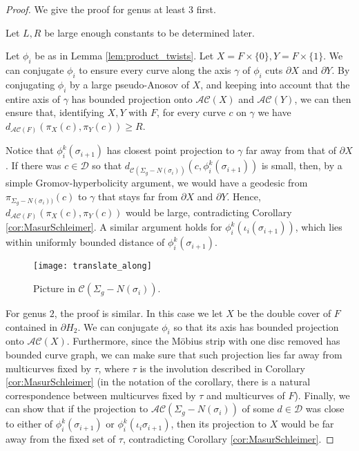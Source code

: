 \documentclass[11pt, oneside]{amsart}
\theoremstyle{definition}
\theoremstyle{definition}
\newcommand{\calD} {\ensuremath {\mathcal{D}}}
\begin{document}
\begin{proof}
We give the proof for genus at least $3$ first.

Let $L,R$ be large enough constants to be determined later.

 Let $\phi_i$ be as in Lemma \ref{lem:product_twists}. Let $X=F\times\{0\}, Y=F\times\{1\}$. We can conjugate $\phi_i$ to ensure every curve along the axis $\gamma$ of $\phi_i$ cuts $\partial X$ and $\partial Y$. By conjugating $\phi_i$ by a large pseudo-Anosov of $X$, and keeping into account that the entire axis of $\gamma$ has bounded projection onto $\mathcal{AC}(X)$ and $\mathcal{AC}(Y)$, we can then ensure that, identifying $X,Y$ with $F$, for every curve $c$ on $\gamma$ we have $d_{\mathcal {AC}(F)}(\pi_X(c),\pi_Y(c))\geq R$.
 
 Notice that $\phi_i^k(\sigma_{i+1})$ has closest point projection to $\gamma$ far away from that of $\partial X$. If there was $c\in \calD$ so that $d_{\mathcal C(\Sigma_g-N(\sigma_i))}(c,\phi_i^k(\sigma_{i+1}))$ is small, then, by a simple Gromov-hyperbolicity argument, we would have a geodesic from $\pi_{\Sigma_g-N(\sigma_i))}(c)$ to $\gamma$ that stays far from $\partial X$ and $\partial Y$. Hence, $d_{\mathcal {AC}(F)}(\pi_X(c),\pi_Y(c))$ would be large, contradicting Corollary \ref{cor:MasurSchleimer}. A similar argument holds for $\phi_i^k(\iota_i(\sigma_{i+1}))$, which lies within uniformly bounded distance of $\phi_i^k(\sigma_{i+1})$.
 
\begin{figure}[h]
 \texttt{[image: translate\_along]}
 \caption{Picture in $\mathcal C(\Sigma_g-N(\sigma_i))$.}
\end{figure}

 
 For genus $2$, the proof is similar. In this case we let $X$ be the double cover of $F$ contained in $\partial H_2$. We can conjugate $\phi_i$ so that its axis has bounded projection onto $\mathcal{AC}(X)$. Furthermore, since the M\"obius strip with one disc removed has bounded curve graph, we can make sure that such projection lies far away from multicurves fixed by $\tau$, where $\tau$ is the involution described in Corollary \ref{cor:MasurSchleimer} (in the notation of the corollary, there is a natural correspondence between multicurves fixed by $\tau$ and multicurves of $F$). Finally, we can show that if the projection to $\mathcal{AC}(\Sigma_g-N(\sigma_i))$ of some $d\in\calD$ was close to either of $\phi_i^k(\sigma_{i+1})$ or $\phi_i^k(\iota_i\sigma_{i+1})$, then its projection to $X$ would be far away from the fixed set of $\tau$, contradicting Corollary \ref{cor:MasurSchleimer}.
 \end{proof}
\end{document}
